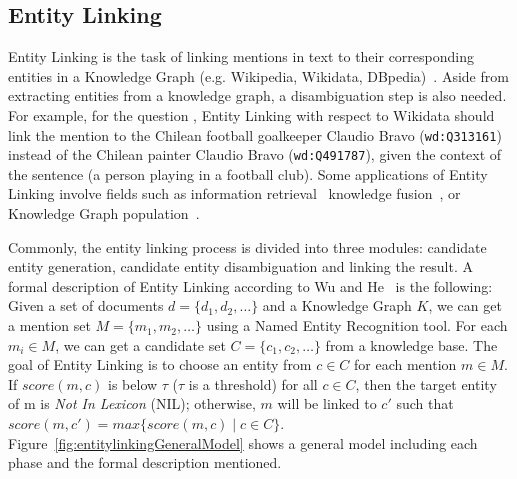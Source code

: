 \subsection{Entity Linking}
\label{cap2:theoFrame/infExtr/entityLinking}
Entity Linking is the task of linking mentions in text to their corresponding entities in a 
Knowledge Graph (e.g. Wikipedia, Wikidata, DBpedia)~\cite{EL:survey-WuHH18}. Aside from 
extracting entities from a knowledge graph, a disambiguation step is also needed. For example, 
for the question , Entity Linking 
with respect to Wikidata should link the mention  to the Chilean 
football goalkeeper Claudio Bravo (\texttt{wd:Q313161}) instead of the Chilean painter Claudio Bravo 
(\texttt{wd:Q491787}), given the context of the sentence (a person playing in a football club). 
Some applications of Entity Linking involve fields such as information 
retrieval~\cite{infExtr:CornoltiFCRS16, infExtr:BlancoOM15, infExtr:BollegalaMI07} knowledge 
fusion~\cite{infExtr:DongGHHMSZ15, infExtr:BohmFHLMNEHHS12}, or Knowledge Graph 
population~\cite{infExtr:RaoMD13, infExtr:DredzeMRGF10, infExtr:FreedmanMM17}.

Commonly, the entity linking process is divided into three modules: candidate entity 
generation, candidate entity disambiguation and linking the result. A formal description of 
Entity Linking according to Wu and He~\cite{EL:survey-WuHH18} is the following: Given a set of 
documents $d=\{d_1,d_2,\ldots\}$ and a Knowledge Graph $K$, we can get a mention set 
$M=\{m_1, m_2,\ldots\}$ using a Named Entity Recognition tool. For each $m_i \in M$, we can 
get a candidate set $C=\{c_1, c_2,\ldots\}$ from a knowledge base. The goal of Entity Linking 
is to choose an entity from $c \in C$ for each mention $m \in M$. If $score(m,c)$ is below 
$\tau$ ($\tau$ is a threshold) for all $c \in C$, then the target entity of m is 
\textit{Not In Lexicon} (NIL); otherwise, $m$ will be linked to $c'$ such that 
$score(m,c')=max\{score(m,c) \mid c\in C \}$. Figure~\ref{fig:entitylinkingGeneralModel} shows a 
general model including each phase and the formal description mentioned.

